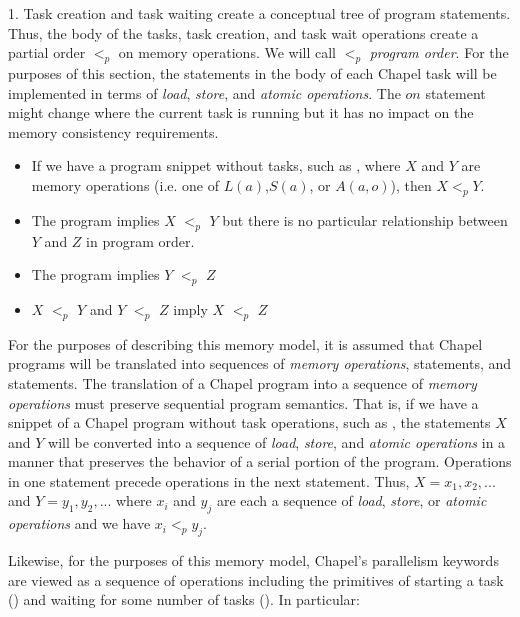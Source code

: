 1. Task creation and task waiting create a conceptual tree of program
statements. Thus, the body of the tasks, task creation, and task wait
operations create a partial order $<_p$ on memory operations.  We will call
$<_p$ \textit{program order}.  For the purposes of this section, the statements in the body of each
Chapel task will be implemented in terms of \textit{load}, \textit{store}, and
\textit{atomic operations}. The $on$ statement might change where the current
task is running but it has no impact on the memory consistency requirements.

\begin{itemize}

  \item If we have a program snippet without tasks, such as , where
$X$ and $Y$ are memory operations (i.e. one of $L(a)$,$S(a)$, or $A(a,o)$), then
$X <_p Y$.

  \item The program  implies $X$ $<_p$ $Y$ but there is
no particular relationship between $Y$ and $Z$ in program order.

  \item {} The program  implies $Y$ $<_p$ $Z$
  \item $X$ $<_p$ $Y$ and $Y$ $<_p$ $Z$ imply $X$ $<_p$ $Z$
\end{itemize}

For the purposes of describing this memory model, it is assumed that Chapel
programs will be translated into sequences of \textit{memory operations},
 statements, and  statements. The translation of a
Chapel program into a sequence of \textit{memory operations} must preserve
sequential program semantics. That is, if we have a snippet of a Chapel program
without task operations, such as , the statements $X$ and $Y$ will
be converted into a sequence of \textit{load}, \textit{store}, and
\textit{atomic operations} in a manner that preserves the behavior of a serial
portion of the program. Operations in one statement precede operations in the
next statement.  Thus, $X=x_1,x_2,...$ and $Y=y_1,y_2,...$ where $x_i$ and
$y_j$ are each a sequence of \textit{load}, \textit{store}, or \textit{atomic
operations} and we have $x_i <_p y_j$.

Likewise, for the purposes of this memory model, Chapel's parallelism keywords
are viewed as a sequence of operations including the primitives of starting a
task () and waiting for some number of tasks
(). In particular:

